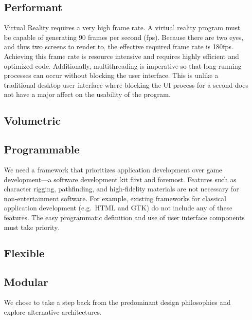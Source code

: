 \documentclass[conference,12pt]{IEEEtran}
\begin{document}
\subsection{Performant}
Virtual Reality requires a very high frame rate. A virtual reality program must
be capable of generating 90 frames per second (fps). Because there are two eyes,
and thus two screens to render to, the effective required frame rate is 180fps.
Achieving this frame rate is resource intensive and requires highly efficient
and optimized code. Additionally, multithreading is imperative so that
long-running processes can occur without blocking the user interface. This is
unlike a traditional desktop user interface where blocking the UI process for a
second does not have a major affect on the usability of the program.

\subsection{Volumetric}

\subsection{Programmable}

We need a framework that prioritizes application development over game
development---a software development kit first and foremost. Features such as
character rigging, pathfinding, and high-fidelity materials are not necessary
for non-entertainment software. For example, existing frameworks for classical
application development (e.g.\ HTML and GTK) do not include any of these
features. The easy programmatic definition and use of user interface components
must take priority.

\subsection{Flexible}

\subsection{Modular}

We chose to take a step back from the predominant design philosophies and
explore alternative architectures.
\end{document}
